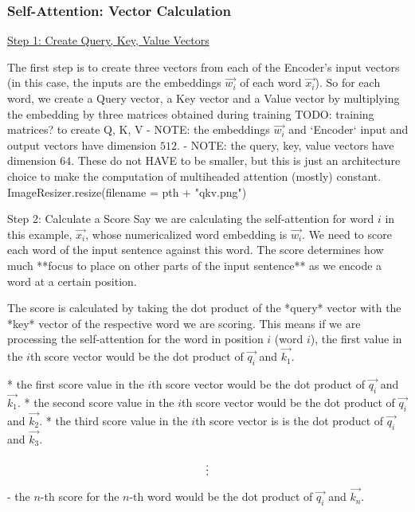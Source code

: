 \subsubsection{Self-Attention: Vector Calculation}

\underline{Step 1: Create Query, Key, Value Vectors}

The first step is to create three vectors from each of the Encoder's input vectors (in this case, the inputs are the embeddings $\overrightarrow{w_i}$ of each word $\overrightarrow{x_i}$). So for each word, we create a Query vector, a Key vector and a Value vector by multiplying the embedding by three matrices obtained during training
TODO: training matrices? to create Q, K, V
- NOTE: the embeddings $\overrightarrow{w_i}$ and `Encoder` input and output vectors have dimension $512$.
- NOTE: the query, key, value vectors have dimension $64$. These do not HAVE to be smaller, but this is just an architecture choice to make the computation of multiheaded attention (mostly) constant.
ImageResizer.resize(filename = pth + "qkv.png")

Step 2: Calculate a Score
Say we are calculating the self-attention for word $i$ in this example, $\overrightarrow{x_i}$, whose numericalized word embedding is $\overrightarrow{w_i}$. We need to score each word of the input sentence against this word. The score determines how much **focus to place on other parts of the input sentence** as we encode a word at a certain position.

The score is calculated by taking the dot product of the *query* vector with the *key* vector of the respective word we are scoring. This means if we are processing the self-attention for the word in position $i$ (word $i$), the first value in the $i$th score vector would be the dot product of $\overrightarrow{q_i}$ and $\overrightarrow{k_1}$.

* the first score value in the $i$th score vector would be the dot product of $\overrightarrow{q_i}$ and $\overrightarrow{k_1}$.
* the second score value in the $i$th score vector would be the dot product of $\overrightarrow{q_i}$ and $\overrightarrow{k_2}$.
* the third score value in the $i$th score vector is is the dot product of $\overrightarrow{q_i}$ and $\overrightarrow{k_3}. $

$$ \vdots \\ $$
- the $n$-th score for the $n$-th word would be the dot product of $\overrightarrow{q_i}$ and $\overrightarrow{k_n}$.

